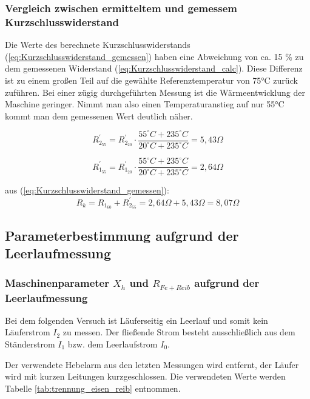 \documentclass[conference]{IEEEtran}
\begin{document}
\subsubsection{Vergleich zwischen ermitteltem und gemessem Kurzschlusswiderstand}

Die Werte des berechnete Kurzschlusswiderstands
(\ref{eq:Kurzschlusswiderstand_gemessen}) haben eine Abweichung von ca. 15 \%
zu dem gemessenen Widerstand (\ref{eq:Kurzschlusswiderstand_calc}). Diese
Differenz ist zu einem großen Teil auf die gewählte Referenztemperatur von 75°C
zurück zuführen. Bei einer zügig durchgeführten Messung ist die
Wärmeentwicklung der Maschine geringer. Nimmt man also einen Temperaturanstieg
auf nur 55°C kommt man dem gemessenen Wert deutlich näher.

\begin{equation}
    R_{2_{55}}^\prime = R_{2_{20}}^\prime \cdot \dfrac{55^\circ \si{C} + 235^\circ \si{C}}{20^\circ \si{C} + 235^\circ \si{C}} = 5,43 \Omega
\end{equation}

\begin{equation}
    R_{1_{55}}^\prime = R_{1_{20}}^\prime \cdot \dfrac{55^\circ \si{C} + 235^\circ \si{C}}{20^\circ \si{C} + 235^\circ \si{C}} = 2,64 \Omega
\end{equation}

aus (\ref{eq:Kurzschlusswiderstand_gemessen}):
\begin{equation}
    \boxed{R_{k} = R_{1_{60}} + R_{2_{55}}^\prime = 2,64 \Omega + 5,43 \Omega = 8,07 \Omega}
\end{equation}


\subsection{Parameterbestimmung aufgrund der Leerlaufmessung}
\subsubsection{Maschinenparameter $X_h$ und $R_{Fe+Reib}$ aufgrund der Leerlaufmessung}

Bei dem folgenden Versuch ist Läuferseitig ein Leerlauf und somit kein
Läuferstrom $I_{2}$ zu messen. Der fließende Strom besteht ausschließlich aus
dem Ständerstrom $I_{1}$ bzw. dem Leerlaufstrom $I_{0}$.

Der verwendete Hebelarm aus den letzten Messungen wird entfernt, der Läufer
wird mit kurzen Leitungen kurzgeschlossen.  Die verwendeten Werte werden
Tabelle \ref{tab:trennung_eisen_reib} entnommen.
\end{document}
